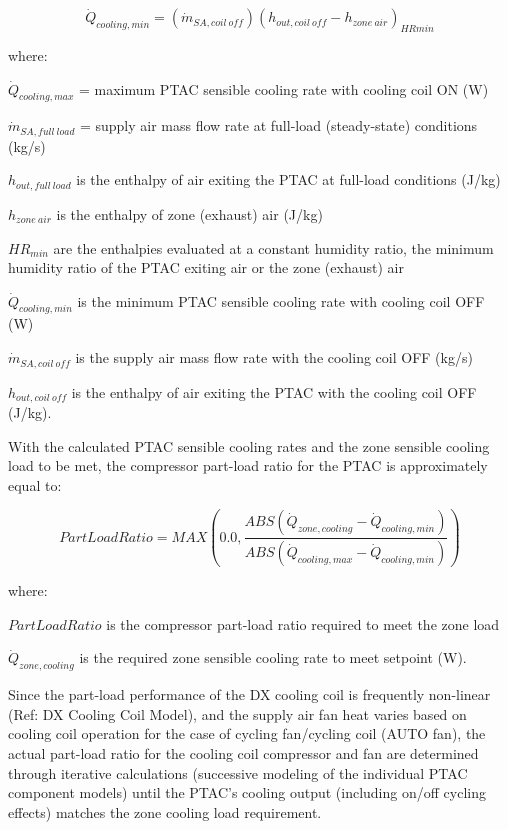 \begin{equation}
  \dot{Q}_{cooling,min} = \left( \dot{m}_{SA,coil~off} \right) \left( h_{out,coil~off} - h_{zone~air} \right)_{HRmin}
\end{equation}

where:

\(\dot{Q}_{cooling,max}\) = maximum PTAC sensible cooling rate with cooling coil ON (W)

\(\dot{m}_{SA,full~load}\) = supply air mass flow rate at full-load (steady-state) conditions (kg/s)

\(h_{out,full~load}\) is the enthalpy of air exiting the PTAC at full-load conditions (J/kg)

\(h_{zone~air}\) is the enthalpy of zone (exhaust) air (J/kg)

\(HR_{min}\) are the enthalpies evaluated at a constant humidity ratio, the minimum humidity ratio of the PTAC exiting air or the zone (exhaust) air

\(\dot{Q}_{cooling,min}\) is the minimum PTAC sensible cooling rate with cooling coil OFF (W)

\(\dot{m}_{SA,coil~off}\) is the supply air mass flow rate with the cooling coil OFF (kg/s)

\(h_{out,coil~off}\) is the enthalpy of air exiting the PTAC with the cooling coil OFF (J/kg).

With the calculated PTAC sensible cooling rates and the zone sensible cooling load to be met, the compressor part-load ratio for the PTAC is approximately equal to:

\begin{equation}
  PartLoadRatio = MAX \left( 0.0, \frac{ABS \left( \dot{Q}_{zone,cooling} - \dot{Q}_{cooling,min} \right)}{ABS \left( \dot{Q}_{cooling,max} - \dot{Q}_{cooling,min} \right)} \right)
\end{equation}

where:

\(PartLoadRatio\) is the compressor part-load ratio required to meet the zone load

\(\dot{Q}_{zone,cooling}\) is the required zone sensible cooling rate to meet setpoint (W).

Since the part-load performance of the DX cooling coil is frequently non-linear (Ref: DX Cooling Coil Model), and the supply air fan heat varies based on cooling coil operation for the case of cycling fan/cycling coil (AUTO fan), the actual part-load ratio for the cooling coil compressor and fan are determined through iterative calculations (successive modeling of the individual PTAC component models) until the PTAC's cooling output (including on/off cycling effects) matches the zone cooling load requirement.

